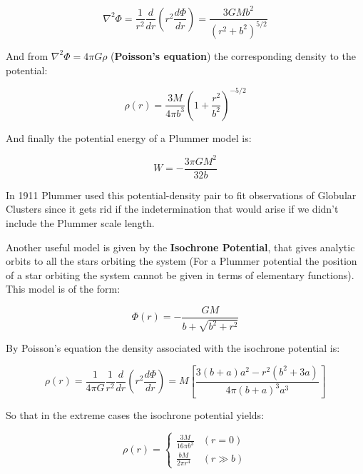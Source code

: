 \begin{equation}
\nabla^{2}\Phi=\frac{1}{r^{2}}\frac{d}{dr}\left(r^{2}\frac{d\Phi}{dr}\right)=\frac{3GMb^{2}}{\left(r^{2}+b^{2}\right)^{5/2}}
\end{equation}

And from $\nabla^{2}\Phi=4\pi G\rho$ (\textbf{Poisson's equation}) the corresponding density to the potential:

\begin{equation}
\rho(r)=\frac{3M}{4\pi b^{3}}\left(1+\frac{r^{2}}{b^{2}}\right)^{-5/2}
\end{equation}

And finally the potential energy of a Plummer model is:

\begin{equation}
W=-\frac{3\pi GM^{2}}{32b}
\end{equation}

In 1911 Plummer used this potential-density pair to fit observations of Globular Clusters since it gets rid if the indetermination that would arise if we didn't include the Plummer scale length.

Another useful model is given by the \textbf{Isochrone Potential}, that gives analytic orbits to all the stars orbiting the system (For a Plummer potential the position of a star orbiting the system cannot be given in terms of elementary functions). This model is of the form:

\begin{equation}
\Phi(r)=-\frac{GM}{b+\sqrt{b^{2}+r^{2}}}
\end{equation}

By Poisson's equation the density associated with the isochrone potential is:

\begin{equation}
\rho(r)=\frac{1}{4\pi G}\frac{1}{r^{2}}\frac{d}{dr}\left(r^{2}\frac{d\Phi}{dr}\right)=M\left[\frac{3\left(b+a\right)a^{2}-r^{2}(b^{2}+3a)}{4\pi(b+a)^{3}a^{3}}\right]
\end{equation}

So that in the extreme cases the isochrone potential yields:

\begin{equation}
\rho(r) = \left\lbrace
\begin{array}{ll}
\frac{3M}{16\pi b^{3}} & (r=0)\\
\frac{bM}{2\pi r^{4}} & (r\gg b)
\end{array}
\right.
\end{equation} 

